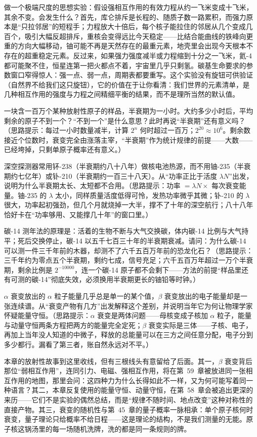 
\begin{thought}[如果强相互作用的力程变成十倍]
做一个极端尺度的思想实验：假设强相互作用的有效力程从约一飞米变成十飞米，其余不变。会发生什么？首先，库仑排斥是长程的、随质子数一路累积，而强力原本是“只拉邻居”的短程手；力程放大十倍后，每个核子能拉住的邻居从几个变成几百个，吸引大幅反超排斥，重核会变得远比今天稳定——比结合能曲线的铁峰向更重的方向大幅移动，铀可能不再是天然存在的最重元素，地壳里会出现今天根本不存在的超重稳定元素。反过来，如果强力强度减半或力程缩到十分之一飞米，氦-4 都可能聚不住，恒星连第一把火都点不着，宇宙里几乎只剩氢。碳基生命要求的参数窗口窄得惊人：强一点、弱一点，周期表都要重写。这个实验没有旋钮可供验证（自然界不给我们这只旋钮），它的价值在于让你看清：我们世界的元素清单，是几种相互作用的强度与力程之间精细平衡的结果，而不是理所当然的默认值。
\end{thought}

\begin{puzzles}
\item 一块含一百万个某种放射性原子的样品，半衰期为一小时。大约多少小时后，平均剩余的原子不到一个？“不到一个”是什么意思？此时再说“半衰期”还有意义吗？（思路提示：每过一小时数量减半，计算 \(2^n\) 何时超过一百万；\(2^{20}\approx10^{6}\)。剩余数接近个位数时，衰变完全由涨落主宰，“半衰期”作为统计规律的前提——大数——已经垮掉，只剩单原子概率还有意义。）
\item 深空探测器常用钚-238（半衰期约八十八年）做核电池热源，而不用铀-235（半衰期约七亿年）或钋-210（半衰期约一百三十八天）。从“功率正比于活度 \(\lambda N\)”出发，说明为什么半衰期太长、太短都不合用。（思路提示：功率 \(=\lambda N\times\) 每次衰变能量。铀-235 的 \(\lambda\) 太小，同样质量活度低得可怜，发热功率微乎其微；钋-210 的 \(\lambda\) 很大，功率起初强劲，但几个月就烧掉一大半，撑不了十年的深空航行；八十八年恰好卡在“功率够用、又能撑几十年”的窗口里。）
\item 碳-14 测年法的原理是：活着的生物不断与大气交换碳，体内碳-14 比例与大气持平；死后交换停止，碳-14 以五千七百三十年的半衰期衰减。请问：为什么碳-14 可以测一件三千年前的木器，却测不了六千五百万年前的恐龙化石？（思路提示：三千年约为零点五个半衰期，剩约七成，信号充足；六千五百万年超过一万个半衰期，剩余比例是 \(2^{-10000}\)，连一个碳-14 原子都不会剩下——方法的前提“样品里还有可测的碳-14”彻底失效，必须换用半衰期更长的铀铅等时钟。）
\item \(\alpha\) 衰变放出的 \(\alpha\) 粒子能量几乎总是单一的某个值，\(\beta\) 衰变放出的电子能量却是一张连续谱。从“衰变产物有几方”出发解释这个差别，并说明当年它为何让物理学家怀疑能量守恒。（思路提示：\(\alpha\) 衰变是两体问题——母核变成子核加 \(\alpha\) 粒子，能量与动量守恒两条方程把两方的能量完全定死；\(\beta\) 衰变实际是三体——子核、电子，再加上当年没人知道的中微子，释放的总能量可以在三方之间任意分配，电子分到多少都行。漏看了第三者，账自然永远对不平。）
\end{puzzles}

本章的放射性故事到这里收线，但有三根线头有意留给了后面。其一，\(\beta\) 衰变背后那位“弱相互作用”，连同引力、电磁、强相互作用，将在第~59~章被放进同一张相互作用的地图，那里会问：这四种力为什么长得如此不一样，又为何可能写着同一种语言？其二，本章反复使用的能量守恒、动量守恒，在第~58~章会被追出更深的来历——它们不是实验的偶然总结，而是“规律不随时间、地点改变”这种对称性的直接产物。其三，衰变的随机性与第~45~章的量子概率一脉相承：单个原子核何时衰变，量子理论只给概率不给日程——这是理论的结构，不是我们测量的无能。原子核这锅汤里的每一场随机洗牌，洗的都是同一条规则的牌。
